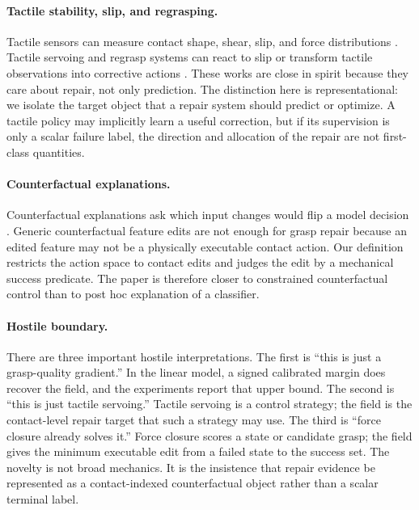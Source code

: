 \documentclass{article}
\begin{document}
\paragraph{Tactile stability, slip, and regrasping.}
Tactile sensors can measure contact shape, shear, slip, and force distributions \citep{yuan2015measurement,lambeta2020digit}. Tactile servoing and regrasp systems can react to slip or transform tactile observations into corrective actions \citep{chebotar2016bigs,veiga2018grip,hogan2018tactile,hogan2020tactile}. These works are close in spirit because they care about repair, not only prediction. The distinction here is representational: we isolate the target object that a repair system should predict or optimize. A tactile policy may implicitly learn a useful correction, but if its supervision is only a scalar failure label, the direction and allocation of the repair are not first-class quantities.

\paragraph{Counterfactual explanations.}
Counterfactual explanations ask which input changes would flip a model decision \citep{pearl2009causality,wachter2017counterfactual}. Generic counterfactual feature edits are not enough for grasp repair because an edited feature may not be a physically executable contact action. Our definition restricts the action space to contact edits and judges the edit by a mechanical success predicate. The paper is therefore closer to constrained counterfactual control than to post hoc explanation of a classifier.

\paragraph{Hostile boundary.}
There are three important hostile interpretations. The first is ``this is just a grasp-quality gradient.'' In the linear model, a signed calibrated margin does recover the field, and the experiments report that upper bound. The second is ``this is just tactile servoing.'' Tactile servoing is a control strategy; the field is the contact-level repair target that such a strategy may use. The third is ``force closure already solves it.'' Force closure scores a state or candidate grasp; the field gives the minimum executable edit from a failed state to the success set. The novelty is not broad mechanics. It is the insistence that repair evidence be represented as a contact-indexed counterfactual object rather than a scalar terminal label.
\end{document}
